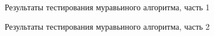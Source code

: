 \clearpage
\begin{figure}[h!]
	
	
	\caption{Результаты тестирования муравьиного алгоритма, часть 1}
	
	\label{fig:x1}
	
\end{figure}


\clearpage
\begin{figure}[h!]
	
	
	\caption{Результаты тестирования муравьиного алгоритма, часть 2}
	
	\label{fig:x2}
	
\end{figure}

